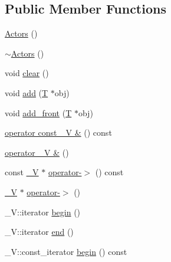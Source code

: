 \subsection*{Public Member Functions}
\begin{DoxyCompactItemize}
\item 
\hyperlink{class_d_d4hep_1_1_simulation_1_1_geant4_action_1_1_actors_af8c90e54776c4e396fbce217553611ec}{Actors} ()
\item 
\hyperlink{class_d_d4hep_1_1_simulation_1_1_geant4_action_1_1_actors_a3c0f3b0099d834512cbdb13c9555c783}{$\sim$\+Actors} ()
\item 
void \hyperlink{class_d_d4hep_1_1_simulation_1_1_geant4_action_1_1_actors_a6f7c4daf69449e916f62cf5767041aa8}{clear} ()
\item 
void \hyperlink{class_d_d4hep_1_1_simulation_1_1_geant4_action_1_1_actors_af07f7dfb10fad18b8580460f44c88f49}{add} (\hyperlink{class_t}{T} $\ast$obj)
\item 
void \hyperlink{class_d_d4hep_1_1_simulation_1_1_geant4_action_1_1_actors_a024c3bcc6d543af13bf58066d245df9a}{add\+\_\+front} (\hyperlink{class_t}{T} $\ast$obj)
\item 
\hyperlink{class_d_d4hep_1_1_simulation_1_1_geant4_action_1_1_actors_ad292ecb199162749cc5256605571c0d6}{operator const \+\_\+\+V \&} () const
\item 
\hyperlink{class_d_d4hep_1_1_simulation_1_1_geant4_action_1_1_actors_add6d146b0484877366303b2a7dd7435f}{operator \+\_\+\+V \&} ()
\item 
const \hyperlink{class_d_d4hep_1_1_simulation_1_1_geant4_action_1_1_actors_a18b6dfb1542a2cd036d8317db48f6c16}{\+\_\+V} $\ast$ \hyperlink{class_d_d4hep_1_1_simulation_1_1_geant4_action_1_1_actors_a32462af31dbdab612359f8039941882f}{operator-\/$>$} () const
\item 
\hyperlink{class_d_d4hep_1_1_simulation_1_1_geant4_action_1_1_actors_a18b6dfb1542a2cd036d8317db48f6c16}{\+\_\+V} $\ast$ \hyperlink{class_d_d4hep_1_1_simulation_1_1_geant4_action_1_1_actors_a74da9b8e362394518116e48f8f0d6c63}{operator-\/$>$} ()
\item 
\+\_\+\+V\+::iterator \hyperlink{class_d_d4hep_1_1_simulation_1_1_geant4_action_1_1_actors_a400f8d564251e0bba5cdb1e35f58b72a}{begin} ()
\item 
\+\_\+\+V\+::iterator \hyperlink{class_d_d4hep_1_1_simulation_1_1_geant4_action_1_1_actors_aa1b133c19db8c70d6a46a19fefa430a2}{end} ()
\item 
\+\_\+\+V\+::const\+\_\+iterator \hyperlink{class_d_d4hep_1_1_simulation_1_1_geant4_action_1_1_actors_a878a3d06a58cee254895ee77039baecf}{begin} () const

\end{DoxyCompactItemize}
